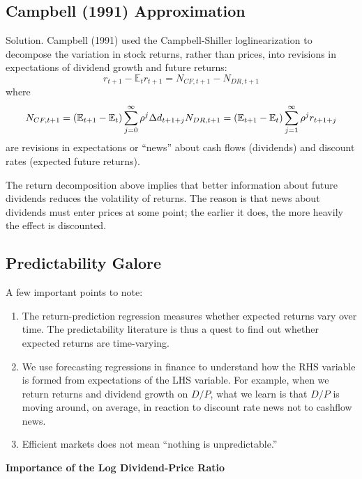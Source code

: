 \documentclass[
]{book}
\providecommand{\tightlist}{%
  \setlength{\itemsep}{0pt}\setlength{\parskip}{0pt}}
\begin{document}
\hypertarget{campbell-1991-approximation}{%
\subsection{Campbell (1991) Approximation}\label{campbell-1991-approximation}}

Solution. Campbell (1991) used the Campbell-Shiller loglinearization to decompose the variation in stock returns, rather than prices, into revisions in expectations of dividend growth and future returns:
\[
r_{t+1}-\mathbb{E}_{t}r_{t+1}=N_{CF,t+1}-N_{DR,t+1}
\]
where
\[
N_{CF,t+1}=\left(\mathbb{E}_{t+1}-\mathbb{E}_{t}\right)\sum_{j=0}^{\infty}\rho^{j}\Delta d_{t+1+j}\\N_{DR,t+1}=\left(\mathbb{E}_{t+1}-\mathbb{E}_{t}\right)\sum_{j=1}^{\infty}\rho^{j}r_{t+1+j}
\]
are revisions in expectations or ``news'' about cash flows (dividends) and discount rates (expected future returns).

The return decomposition above implies that better information about future dividends reduces the volatility of returns. The reason is that news about dividends must enter prices at some point; the earlier it does, the more heavily the effect is discounted.

\hypertarget{predictability-galore}{%
\subsection{Predictability Galore}\label{predictability-galore}}

A few important points to note:

\begin{enumerate}
\def\labelenumi{\arabic{enumi}.}
\tightlist
\item
  The return-prediction regression measures whether expected returns vary over time. The predictability literature is thus a quest to find out whether expected returns are time-varying.
\item
  We use forecasting regressions in finance to understand how the RHS variable is formed from expectations of the LHS variable. For example, when we return returns and dividend growth on \(D/P\), what we learn is that \(D/P\) is moving around, on average, in reaction to discount rate news not to cashflow news.
\item
  Efficient markets does not mean ``nothing is unpredictable.''
\end{enumerate}

\textbf{Importance of the Log Dividend-Price Ratio}
\end{document}
